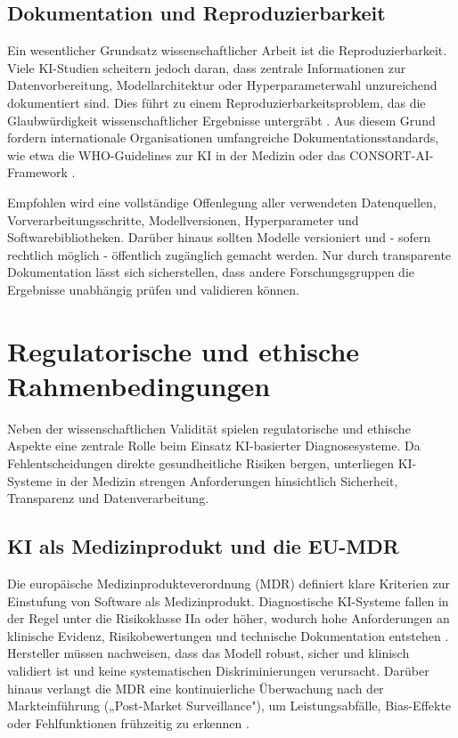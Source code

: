 \documentclass[lettersize,journal]{IEEEtran}
\begin{document}
	\subsection{Dokumentation und Reproduzierbarkeit}

	Ein wesentlicher Grundsatz wissenschaftlicher Arbeit ist die Reproduzierbarkeit. Viele KI-Studien scheitern jedoch daran, dass zentrale Informationen zur Datenvorbereitung, Modellarchitektur oder Hyperparameterwahl unzureichend dokumentiert sind. Dies führt zu einem Reproduzierbarkeitsproblem, das die Glaubwürdigkeit wissenschaftlicher Ergebnisse untergräbt \cite{ref:hutson2018reproducibility}. Aus diesem Grund fordern internationale Organisationen umfangreiche Dokumentationsstandards, wie etwa die WHO-Guidelines zur KI in der Medizin oder das CONSORT-AI-Framework \cite{ref:consortai2020}.
	
	Empfohlen wird eine vollständige Offenlegung aller verwendeten Datenquellen, Vorverarbeitungsschritte, Modellversionen, Hyperparameter und Softwarebibliotheken. Darüber hinaus sollten Modelle versioniert und - sofern rechtlich möglich - öffentlich zugänglich gemacht werden. Nur durch transparente Dokumentation lässt sich sicherstellen, dass andere Forschungsgruppen die Ergebnisse unabhängig prüfen und validieren können.
	

	\section{Regulatorische und ethische Rahmenbedingungen}

	Neben der wissenschaftlichen Validität spielen regulatorische und ethische Aspekte eine zentrale Rolle beim Einsatz KI-basierter Diagnosesysteme. Da Fehlentscheidungen direkte gesundheitliche Risiken bergen, unterliegen KI-Systeme in der Medizin strengen Anforderungen hinsichtlich Sicherheit, Transparenz und Datenverarbeitung.
	
	\subsection{KI als Medizinprodukt und die EU-MDR}

	Die europäische Medizinprodukteverordnung (MDR) definiert klare Kriterien zur Einstufung von Software als Medizinprodukt. Diagnostische KI-Systeme fallen in der Regel unter die Risikoklasse IIa oder höher, wodurch hohe Anforderungen an klinische Evidenz, Risikobewertungen und technische Dokumentation entstehen \cite{ref:mdr2017}. Hersteller müssen nachweisen, dass das Modell robust, sicher und klinisch validiert ist und keine systematischen Diskriminierungen verursacht. Darüber hinaus verlangt die MDR eine kontinuierliche Überwachung nach der Markteinführung („Post-Market Surveillance"), um Leistungsabfälle, Bias-Effekte oder Fehlfunktionen frühzeitig zu erkennen \cite{ref:ema2023ai}.
	
\end{document}
